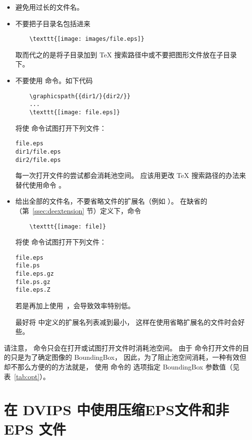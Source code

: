 \begin{itemize}
\item 避免用过长的文件名。

\item 不要把子目录名包括进来
	\begin{lstlisting}
	\texttt{[image: images/file.eps]}
	\end{lstlisting}
	取而代之的是将子目录加到 \TeX{} 搜索路径中或不要把图形文件放在子目录下。
	
\item 不要使用  命令。如下代码
	\begin{lstlisting}
	\graphicspath{{dir1/}{dir2/}}
	...
	\texttt{[image: file.eps]}
	\end{lstlisting}
	将使  命令试图打开下列文件：
\begin{Verbatim}[xleftmargin=1.5cm]
file.eps
dir1/file.eps
dir2/file.eps
\end{Verbatim}
	每一次打开文件的尝试都会消耗池空间。
	应该用更改 \TeX{} 搜索路径的办法来替代使用命令 。
	
\item 给出全部的文件名，不要省略文件的扩展名（例如 ）。
	在缺省的  （第~\ref{ssec:deextension} 节）定义下，命令
	\begin{lstlisting}
	\texttt{[image: file]}
	\end{lstlisting}
	将使  命令试图打开下列文件：
\begin{Verbatim}[xleftmargin=1.5cm]
file.eps
file.ps
file.eps.gz
file.ps.gz
file.eps.Z
\end{Verbatim}
	若是再加上使用~，会导致效率特别低。
	
	最好将  中定义的扩展名列表减到最小，
	这样在使用省略扩展名的文件时会好些。
\end{itemize}

请注意， 命令只会在打开或试图打开文件时消耗池空间。
由于  命令打开文件的目的只是为了确定图像的 BoundingBox，
因此，为了阻止池空间消耗，一种有效但却不那么方便的的方法就是，
使用  命令的  选项指定 BoundingBox 参数值（见表~\ref{tab:opt}）。


\section{在 DVIPS 中使用压缩EPS文件和非 EPS 文件}\label{sec:dvips-noneps}

